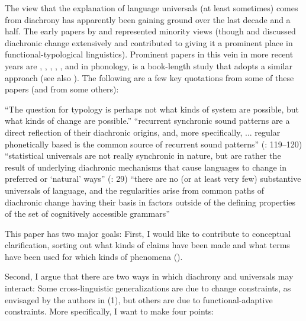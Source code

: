 \documentclass[output=paper]{langsci/langscibook}
\begin{document}
The view that the explanation of language universals (at least sometimes) comes from diachrony has apparently been gaining ground over the last decade and a half. The early papers by \citet{Greenberg1969, Greenberg1978_Diachr} and \citet{Bybee1988} represented minority views (though \citealt{Givón1979} and \citealt{Lehmann1982} discussed diachronic change extensively and contributed to giving it a prominent place in functional-typological linguistics). Prominent papers in this vein in more recent years are \citet{Aristar1991}, \citet{Anderson2005, Anderson2008, Anderson2016}, \citet{Cristofaro2012, Cristofaro2013, Cristofaro2014}, \citet{Creissels2008}, \citet{GildeaZúñiga2016}, and in phonology, \citet{Blevins2004} is a book-length study that adopts a similar approach (see also \citealt{Blevins2006}). The following are a few key quotations from some of these papers (and from some others):

\eanoraggedright
  \ea “The question for typology is perhaps not what kinds of system are possible, but what kinds of change are possible.” \citep[195]{Timberlake2003}
  \ex “recurrent synchronic sound patterns are a direct reflection of their diachronic origins, and, more specifically, ... regular phonetically based  is the common source of recurrent sound patterns” (\citealt{Blevins2006}: 119–120)
  \ex “statistical universals are not really synchronic in nature, but are rather the result of underlying diachronic mechanisms that cause languages to change in preferred or ‘natural’ ways” (\citealt{BickelEtAl2015}: 29)
  \ex “there are no (or at least very few) substantive universals of language, and the regularities arise from common paths of diachronic change having their basis in factors outside of the defining properties of the set of cognitively accessible grammars” \citep[11]{Anderson2016}
  \z
\z

This paper has two major goals: First, I would like to contribute to conceptual clarification, sorting out what kinds of claims have been made and what terms have been used for which kinds of phenomena ().

Second, I argue that there are two ways in which diachrony and universals may interact: Some cross-linguistic generalizations are due to change constraints, as envisaged by the authors in (1), but others are due to functional-adaptive constraints. More specifically, I want to make four points:
\end{document}
